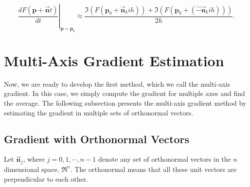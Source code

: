 \documentclass{article}
\begin{document}
\begin{equation}\left. \frac{dF(\mathbf{p} + \vec{\mathbf{n}}t)}{dt} \right|_{\mathbf{p}=\mathbf{p}_0} \approx \frac{ \Im ( F (\mathbf{p}_0 + \vec{\mathbf{n}}_k i h )) + \Im ( F (\mathbf{p}_0 + (\vec{\mathbf{-n}}_k i h )))}{2h} .  \label{Eq:SquireTrapp2}
\end{equation}

\section{Multi-Axis Gradient Estimation} 

Now, we are ready to develop the first method, which we call the multi-axis gradient. In this case, we simply compute the gradient for multiple axes and find the average. The following subsection presents the multi-axis gradient method by estimating the gradient in multiple sets of orthonormal vectors. 

\subsection{Gradient with Orthonormal Vectors} 

Let $\vec{\mathbf{n}}_j$, where $j=0,1,\cdots, n-1$  denote any set of orthonormal vectors in the $n$ dimensional space, $\Re^n$. The orthonormal means that all these unit vectors are perpendicular to each other.  
\end{document}
